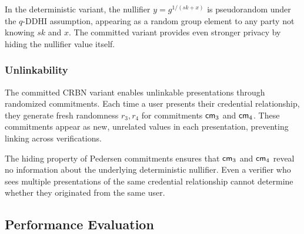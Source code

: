 In the deterministic variant, the nullifier $y = g^{1/(sk+x)}$ is pseudorandom under the $q$-DDHI assumption, appearing as a random group element to any party not knowing $sk$ and $x$. The committed variant provides even stronger privacy by hiding the nullifier value itself.

\subsubsection{Unlinkability}

The committed CRBN variant enables unlinkable presentations through randomized commitments. Each time a user presents their credential relationship, they generate fresh randomness $r_3, r_4$ for commitments $\mathsf{cm}_3$ and $\mathsf{cm}_4$. These commitments appear as new, unrelated values in each presentation, preventing linking across verifications.

The hiding property of Pedersen commitments ensures that $\mathsf{cm}_3$ and $\mathsf{cm}_4$ reveal no information about the underlying deterministic nullifier. Even a verifier who sees multiple presentations of the same credential relationship cannot determine whether they originated from the same user.






























































\subsection{Performance Evaluation}\label{sec:performance-vrf}

